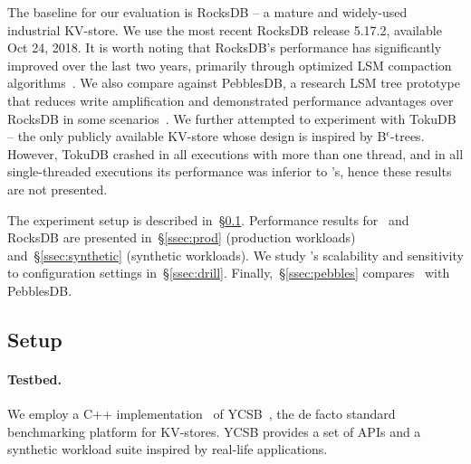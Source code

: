 The baseline for our evaluation is RocksDB -- a mature and widely-used industrial KV-store. 
We use the most recent RocksDB release 5.17.2, available Oct 24, 2018.  
It is worth noting that RocksDB's performance has significantly improved  over the last two years, primarily through 
optimized LSM compaction algorithms~\cite{CallaghanCompaction}.   We also compare against PebblesDB, 
a research LSM tree prototype that reduces  write amplification  and demonstrated performance advantages
over RocksDB in some scenarios~\cite{PebblesDB}. We further attempted to experiment with TokuDB~\cite{TokuDB} -- 
the only publicly available KV-store whose design is inspired by B$^\epsilon$-trees. However, TokuDB crashed 
in all executions with more than one thread, and in all single-threaded executions its performance was 
inferior to \sys's, hence these results are not presented.

The experiment setup is described in~\S\ref{ssec:setup}. 
Performance results for \sys\ and RocksDB are presented in~\S\ref{ssec:prod} (production workloads)
and~\S\ref{ssec:synthetic} (synthetic workloads). We study  \sys's scalability and sensitivity to  
configuration settings in~\S\ref{ssec:drill}. Finally,~\S\ref{ssec:pebbles} compares \sys\ with PebblesDB.
 
\subsection{Setup}
\label{ssec:setup} 

\paragraph{Testbed.} We employ a C++ implementation~\cite{Cpp-YCSB} of YCSB~\cite{YCSB}, the  de facto standard  
benchmarking platform for KV-stores. YCSB provides a set of APIs and a synthetic workload suite inspired 
by real-life applications. 
 
